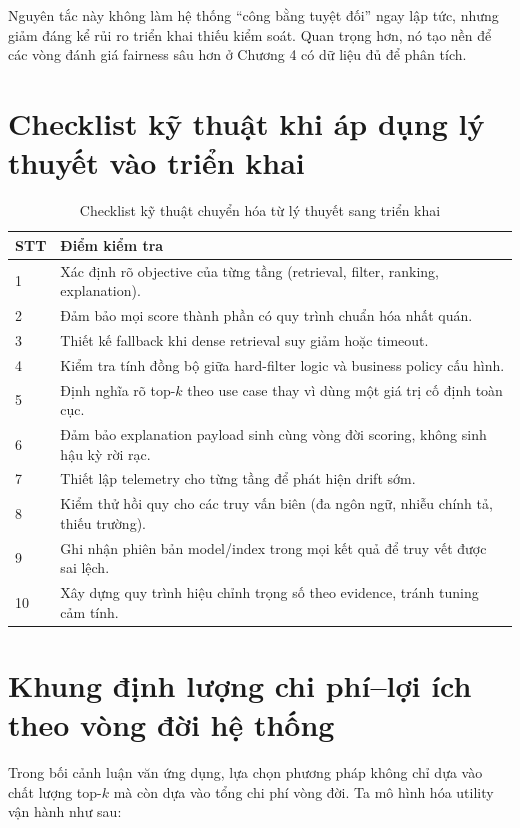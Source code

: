 Nguyên tắc này không làm hệ thống “công bằng tuyệt đối” ngay lập tức, nhưng giảm đáng kể rủi ro triển khai thiếu kiểm soát. Quan trọng hơn, nó tạo nền để các vòng đánh giá fairness sâu hơn ở Chương 4 có dữ liệu đủ để phân tích.

\section{Checklist kỹ thuật khi áp dụng lý thuyết vào triển khai}

\begin{table}[H]
\caption{Checklist kỹ thuật chuyển hóa từ lý thuyết sang triển khai}
\centering
\begin{tabularx}{\textwidth}{p{}X}
\toprule
\textbf{STT} & \textbf{Điểm kiểm tra}\\
\midrule
1 & Xác định rõ objective của từng tầng (retrieval, filter, ranking, explanation).\\
2 & Đảm bảo mọi score thành phần có quy trình chuẩn hóa nhất quán.\\
3 & Thiết kế fallback khi dense retrieval suy giảm hoặc timeout.\\
4 & Kiểm tra tính đồng bộ giữa hard-filter logic và business policy cấu hình.\\
5 & Định nghĩa rõ top-$k$ theo use case thay vì dùng một giá trị cố định toàn cục.\\
6 & Đảm bảo explanation payload sinh cùng vòng đời scoring, không sinh hậu kỳ rời rạc.\\
7 & Thiết lập telemetry cho từng tầng để phát hiện drift sớm.\\
8 & Kiểm thử hồi quy cho các truy vấn biên (đa ngôn ngữ, nhiễu chính tả, thiếu trường).\\
9 & Ghi nhận phiên bản model/index trong mọi kết quả để truy vết được sai lệch.\\
10 & Xây dựng quy trình hiệu chỉnh trọng số theo evidence, tránh tuning cảm tính.\\
\bottomrule
\end{tabularx}
\end{table}

\section{Khung định lượng chi phí--lợi ích theo vòng đời hệ thống}

Trong bối cảnh luận văn ứng dụng, lựa chọn phương pháp không chỉ dựa vào chất lượng top-$k$ mà còn dựa vào tổng chi phí vòng đời. Ta mô hình hóa utility vận hành như sau:

